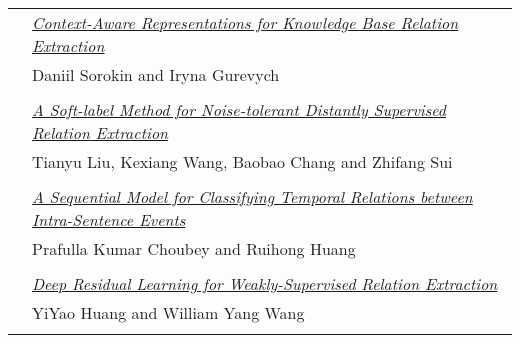 \begin{tabular}{p{20mm}p{128mm}}
 & \hyperlink{page.1784}{\em Context-Aware Representations for Knowledge Base Relation Extraction}\\
         & Daniil Sorokin and Iryna Gurevych \\
\\

 & \hyperlink{page.1790}{\em A Soft-label Method for Noise-tolerant Distantly Supervised Relation Extraction}\\
         & Tianyu Liu, Kexiang Wang, Baobao Chang and Zhifang Sui \\
\\

 & \hyperlink{page.1796}{\em A Sequential Model for Classifying Temporal Relations between Intra-Sentence Events}\\
         & Prafulla Kumar Choubey and Ruihong Huang \\
\\

 & \hyperlink{page.1803}{\em Deep Residual Learning for Weakly-Supervised Relation Extraction}\\
         & YiYao Huang and William Yang Wang \\
\\

\end{tabular}
\newpage
